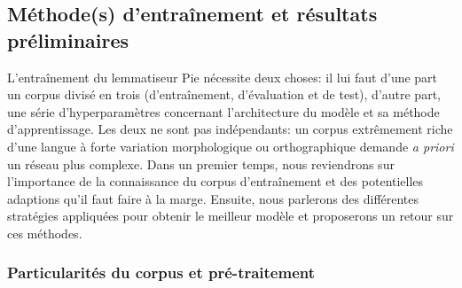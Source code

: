 \subsection{Méthode(s) d'entraînement et résultats préliminaires}

L'entraînement du lemmatiseur Pie nécessite deux choses: il lui faut d'une part un corpus divisé en trois (d'entraînement, d'évaluation et de test), d'autre part, une série d'hyperparamètres concernant l'architecture du modèle et sa méthode d'apprentissage. Les deux ne sont pas indépendants: un corpus extrêmement riche d'une langue à forte variation morphologique ou orthographique demande \textit{a priori} un réseau plus complexe. Dans un premier temps, nous reviendrons sur l'importance de la connaissance du corpus d'entraînement et des potentielles adaptions qu'il faut faire à la marge. Ensuite, nous parlerons des différentes stratégies appliquées pour obtenir le meilleur modèle et proposerons un retour sur ces méthodes.

\subsubsection{Particularités du corpus et pré-traitement}

